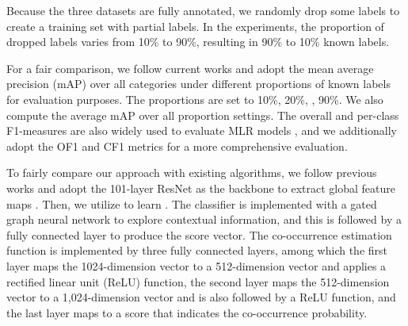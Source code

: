 Because the three datasets are fully annotated, we randomly drop some labels to create a training set with partial labels. In the experiments, the proportion of dropped labels varies from 10\% to 90\%, resulting in 90\% to 10\% known labels.

\quad For a fair comparison, we follow current works \cite{durand2019learning,huynh2020interactive} and adopt the mean average precision (mAP) over all categories under different proportions of known labels for evaluation purposes. The proportions are set to 10\%, 20\%, , 90\%. We also compute the average mAP over all proportion settings. The overall and per-class F1-measures are also widely used to evaluate MLR models \cite{chen2019learning}, and we additionally adopt the 
OF1 and CF1 metrics for a more comprehensive evaluation.

\quad To fairly compare our approach with existing algorithms, we follow previous works \cite{durand2019learning,chen2019learning} and adopt the 101-layer ResNet \cite{he2016deep} as the backbone to extract global feature maps . Then, we utilize  to learn . The classifier  is implemented with a gated graph neural network to explore contextual information, and this is followed by a fully connected layer to produce the score vector. The co-occurrence estimation function  is implemented by three fully connected layers, among which the first layer maps the 1024-dimension vector to a 512-dimension vector and applies a rectified linear unit (ReLU) function, the second layer maps the 512-dimension vector to a 1,024-dimension vector and is also followed by a ReLU function, and the last layer maps to a score that indicates the co-occurrence probability.

